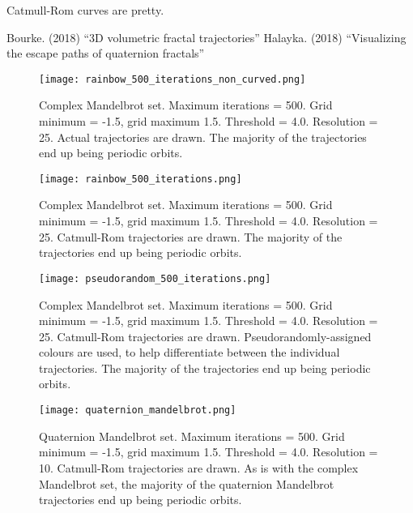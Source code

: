 \documentclass[12pt]{article}
\begin{document}
Catmull-Rom curves are pretty.












\begin{thebibliography}{9}
 Bourke. (2018) ``3D volumetric fractal trajectories''
 Halayka. (2018) ``Visualizing the escape paths of quaternion fractals''
\end{thebibliography}



\pagebreak




\begin{figure} 
\centering
  \texttt{[image: rainbow\_500\_iterations\_non\_curved.png]}	
  \caption{Complex Mandelbrot set.
Maximum iterations = 500.
Grid minimum = -1.5, grid maximum 1.5.
Threshold = 4.0.
Resolution = 25.
Actual trajectories are drawn.
The majority of the trajectories end up being periodic orbits.}
\end{figure}

\begin{figure} 
\centering
  \texttt{[image: rainbow\_500\_iterations.png]}	
  \caption{
Complex Mandelbrot set.
Maximum iterations = 500.
Grid minimum = -1.5, grid maximum 1.5.
Threshold = 4.0. 
Resolution = 25.
Catmull-Rom trajectories are drawn.
The majority of the trajectories end up being periodic orbits.}
\end{figure}

\begin{figure} 
\centering
  \texttt{[image: pseudorandom\_500\_iterations.png]}	
  \caption{
Complex Mandelbrot set.
Maximum iterations = 500.
Grid minimum = -1.5, grid maximum 1.5.
Threshold = 4.0.
Resolution = 25.
Catmull-Rom trajectories are drawn.
Pseudorandomly-assigned colours are used, to help differentiate between the individual trajectories.
The majority of the trajectories end up being periodic orbits.}
\end{figure}


\begin{figure} 
\centering
  \texttt{[image: quaternion\_mandelbrot.png]}	
  \caption{
Quaternion Mandelbrot set.
Maximum iterations = 500.
Grid minimum = -1.5, grid maximum 1.5.
Threshold = 4.0.
Resolution = 10.
Catmull-Rom trajectories are drawn.
As is with the complex Mandelbrot set, the majority of the quaternion Mandelbrot trajectories end up being periodic orbits.}
\end{figure}
\end{document}
